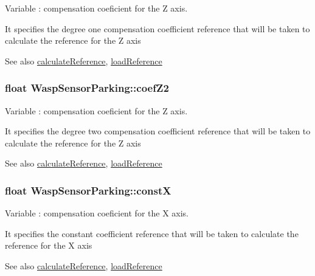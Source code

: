 Variable \+: compensation coeficient for the Z axis. 

It specifies the degree one compensation coefficient reference that will be taken to calculate the reference for the Z axis \begin{DoxySeeAlso}{See also}
\hyperlink{class_wasp_sensor_parking_a8fe1255a714fed88684a89363963eb02}{calculate\+Reference}, \hyperlink{class_wasp_sensor_parking_ada85f8d26b42a4a6733c0e1d1880a4ad}{load\+Reference} 
\end{DoxySeeAlso}
\subsubsection[{\texorpdfstring{coef\+Z2}{coefZ2}}]{\setlength{\rightskip}{0pt plus 5cm}float Wasp\+Sensor\+Parking\+::coef\+Z2}\hypertarget{class_wasp_sensor_parking_a39d3f1d9fc164de3f7fdbaa205de641d}{}\label{class_wasp_sensor_parking_a39d3f1d9fc164de3f7fdbaa205de641d}


Variable \+: compensation coeficient for the Z axis. 

It specifies the degree two compensation coefficient reference that will be taken to calculate the reference for the Z axis \begin{DoxySeeAlso}{See also}
\hyperlink{class_wasp_sensor_parking_a8fe1255a714fed88684a89363963eb02}{calculate\+Reference}, \hyperlink{class_wasp_sensor_parking_ada85f8d26b42a4a6733c0e1d1880a4ad}{load\+Reference} 
\end{DoxySeeAlso}
\subsubsection[{\texorpdfstring{constX}{constX}}]{\setlength{\rightskip}{0pt plus 5cm}float Wasp\+Sensor\+Parking\+::constX}\hypertarget{class_wasp_sensor_parking_a7aca3e77d76cffce8e58dc8a8eb062cb}{}\label{class_wasp_sensor_parking_a7aca3e77d76cffce8e58dc8a8eb062cb}


Variable \+: compensation coeficient for the X axis. 

It specifies the constant coefficient reference that will be taken to calculate the reference for the X axis \begin{DoxySeeAlso}{See also}
\hyperlink{class_wasp_sensor_parking_a8fe1255a714fed88684a89363963eb02}{calculate\+Reference}, \hyperlink{class_wasp_sensor_parking_ada85f8d26b42a4a6733c0e1d1880a4ad}{load\+Reference} 
\end{DoxySeeAlso}
